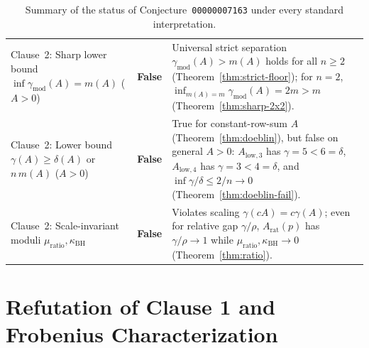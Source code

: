 \documentclass[11pt]{article}
\theoremstyle{definition}
\begin{document}
\begin{table}[ht]
\begin{tabular}{@{}p{}p{}p{}@{}}
\addlinespace[3pt]
Clause~2: Sharp lower bound $\inf \gamma_{\mathrm{mod}}(A) = m(A)$ ($A > 0$) & \textbf{False} & Universal strict separation $\gamma_{\mathrm{mod}}(A) > m(A)$ holds for all $n \ge 2$ (Theorem~\ref{thm:strict-floor}); for $n=2$, $\inf_{m(A)=m} \gamma_{\mathrm{mod}}(A) = 2m > m$ (Theorem~\ref{thm:sharp-2x2}). \\
\addlinespace[3pt]
Clause~2: Lower bound $\gamma(A) \ge \delta(A)$ or $n\,m(A)$ ($A > 0$) & \textbf{False} & True for constant-row-sum $A$ (Theorem~\ref{thm:doeblin}), but false on general $A > 0$: $A_{\mathrm{low},3}$ has $\gamma = 5 < 6 = \delta$, $A_{\mathrm{low},4}$ has $\gamma = 3 < 4 = \delta$, and $\inf \gamma/\delta \le 2/n \to 0$ (Theorem~\ref{thm:doeblin-fail}). \\
\addlinespace[3pt]
Clause~2: Scale-invariant moduli $\mu_{\mathrm{ratio}}, \kappa_{\mathrm{BH}}$ & \textbf{False} & Violates scaling $\gamma(cA) = c\gamma(A)$; even for relative gap $\gamma/\rho$, $A_{\mathrm{rat}}(p)$ has $\gamma/\rho \to 1$ while $\mu_{\mathrm{ratio}}, \kappa_{\mathrm{BH}} \to 0$ (Theorem~\ref{thm:ratio}). \\
\bottomrule
\end{tabular}
\caption{Summary of the status of Conjecture~\texttt{00000007163} under every standard interpretation.}
\label{tab:summary}
\end{table}

\section{Refutation of Clause 1 and Frobenius Characterization}
\end{document}
